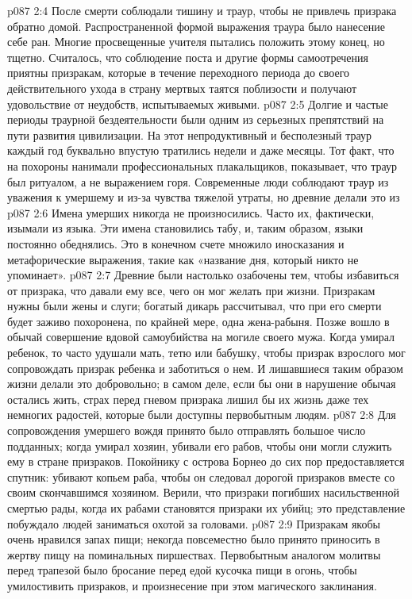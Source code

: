 \vs p087 2:4 После смерти соблюдали тишину и траур, чтобы не привлечь призрака обратно домой. Распространенной формой выражения траура было нанесение себе ран. Многие просвещенные учителя пытались положить этому конец, но тщетно. Считалось, что соблюдение поста и другие формы самоотречения приятны призракам, которые в течение переходного периода до своего действительного ухода в страну мертвых таятся поблизости и получают удовольствие от неудобств, испытываемых живыми.
\vs p087 2:5 Долгие и частые периоды траурной бездеятельности были одним из серьезных препятствий на пути развития цивилизации. На этот непродуктивный и бесполезный траур каждый год буквально впустую тратились недели и даже месяцы. Тот факт, что на похороны нанимали профессиональных плакальщиков, показывает, что траур был ритуалом, а не выражением горя. Современные люди соблюдают траур из уважения к умершему и из\hyp{}за чувства тяжелой утраты, но древние делали это из 
\vs p087 2:6 Имена умерших никогда не произносились. Часто их, фактически, изымали из языка. Эти имена становились табу, и, таким образом, языки постоянно обеднялись. Это в конечном счете множило иносказания и метафорические выражения, такие как «название дня, который никто не упоминает».
\vs p087 2:7 \pc Древние были настолько озабочены тем, чтобы избавиться от призрака, что давали ему все, чего он мог желать при жизни. Призракам нужны были жены и слуги; богатый дикарь рассчитывал, что при его смерти будет заживо похоронена, по крайней мере, одна жена\hyp{}рабыня. Позже вошло в обычай совершение вдовой самоубийства на могиле своего мужа. Когда умирал ребенок, то часто удушали мать, тетю или бабушку, чтобы призрак взрослого мог сопровождать призрак ребенка и заботиться о нем. И лишавшиеся таким образом жизни делали это добровольно; в самом деле, если бы они в нарушение обычая остались жить, страх перед гневом призрака лишил бы их жизнь даже тех немногих радостей, которые были доступны первобытным людям.
\vs p087 2:8 Для сопровождения умершего вождя принято было отправлять большое число подданных; когда умирал хозяин, убивали его рабов, чтобы они могли служить ему в стране призраков. Покойнику с острова Борнео до сих пор предоставляется спутник: убивают копьем раба, чтобы он следовал дорогой призраков вместе со своим скончавшимся хозяином. Верили, что призраки погибших насильственной смертью рады, когда их рабами становятся призраки их убийц; это представление побуждало людей заниматься охотой за головами.
\vs p087 2:9 Призракам якобы очень нравился запах пищи; некогда повсеместно было принято приносить в жертву пищу на поминальных пиршествах. Первобытным аналогом молитвы перед трапезой было бросание перед едой кусочка пищи в огонь, чтобы умилостивить призраков, и произнесение при этом магического заклинания.
